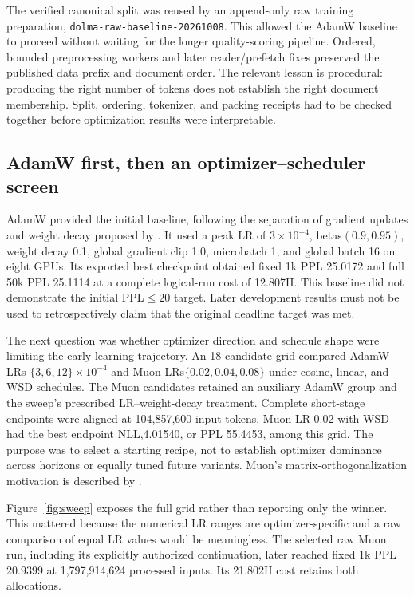 The verified canonical split was reused by an append-only raw training preparation, \texttt{dolma-raw-baseline-20261008}. This allowed the AdamW baseline to proceed without waiting for the longer quality-scoring pipeline. Ordered, bounded preprocessing workers and later reader/prefetch fixes preserved the published data prefix and document order. The relevant lesson is procedural: producing the right number of tokens does not establish the right document membership. Split, ordering, tokenizer, and packing receipts had to be checked together before optimization results were interpretable.

\subsection{AdamW first, then an optimizer--scheduler screen}

AdamW provided the initial baseline, following the separation of gradient updates and weight decay proposed by \citet{adamw}. It used a peak LR of $3\times 10^{-4}$, betas$(0.9,0.95)$, weight decay 0.1, global gradient clip 1.0, microbatch 1, and global batch 16 on eight GPUs. Its exported best checkpoint obtained fixed 1k PPL 25.0172 and full 50k PPL 25.1114 at a complete logical-run cost of 12.807H. This baseline did not demonstrate the initial PPL$\leq 20$ target. Later development results must not be used to retrospectively claim that the original deadline target was met.

The next question was whether optimizer direction and schedule shape were limiting the early learning trajectory. An 18-candidate grid compared AdamW LRs $\{3,6,12\}\times 10^{-4}$ and Muon LRs$\{0.02,0.04,0.08\}$ under cosine, linear, and WSD schedules. The Muon candidates retained an auxiliary AdamW group and the sweep's prescribed LR--weight-decay treatment. Complete short-stage endpoints were aligned at 104,857,600 input tokens. Muon LR 0.02 with WSD had the best endpoint NLL,4.01540, or PPL 55.4453, among this grid. The purpose was to select a starting recipe, not to establish optimizer dominance across horizons or equally tuned future variants. Muon's matrix-orthogonalization motivation is described by \citet{muon}.

Figure~\ref{fig:sweep} exposes the full grid rather than reporting only the winner. This mattered because the numerical LR ranges are optimizer-specific and a raw comparison of equal LR values would be meaningless. The selected raw Muon run, including its explicitly authorized continuation, later reached fixed 1k PPL 20.9399 at 1,797,914,624 processed inputs. Its 21.802H cost retains both allocations.

